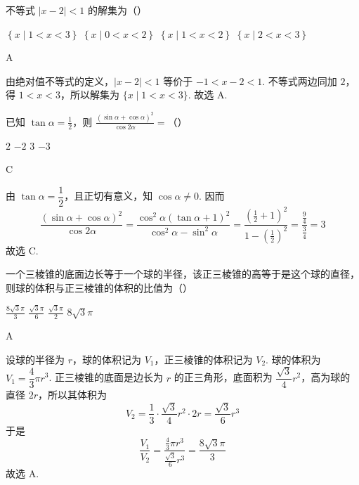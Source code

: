 \begin{problem}
不等式 \( |x-2|<1 \) 的解集为（\quad）

\choices
    {\( \left\{x \mid 1<x<3\right\} \)}
    {\( \left\{x \mid 0<x<2\right\} \)}
    {\( \left\{x \mid 1<x<2\right\} \)}
    {\( \left\{x \mid 2<x<3\right\} \)}
\end{problem}

\begin{answer}
A
\end{answer}

\begin{solution}
由绝对值不等式的定义，\(|x-2|<1\) 等价于 \(-1<x-2<1\). 不等式两边同加 \(2\)，得 \(1<x<3\)，所以解集为 \(\{x\mid 1<x<3\}\). 故选 A.
\end{solution}

\begin{problem}
已知 \( \tan\alpha=\frac{1}{2} \)，则 \( \frac{(\sin\alpha+\cos\alpha)^{2}}{\cos2\alpha}= \)（\quad）

\choices
    {\(2\)}
    {\(-2\)}
    {\(3\)}
    {\(-3\)}
\end{problem}

\begin{answer}
C
\end{answer}

\begin{solution}
由 \(\tan\alpha=\dfrac{1}{2}\)，且正切有意义，知 \(\cos\alpha\ne0\). 因而
\[
\frac{(\sin\alpha+\cos\alpha)^2}{\cos2\alpha}=\frac{\cos^2\alpha(\tan\alpha+1)^2}{\cos^2\alpha-\sin^2\alpha}=\frac{\left(\frac12+1\right)^2}{1-\left(\frac12\right)^2}=\frac{\frac{9}{4}}{\frac{3}{4}}=3
\]
故选 C.
\end{solution}

\begin{problem}
一个三棱锥的底面边长等于一个球的半径，该正三棱锥的高等于是这个球的直径，则球的体积与正三棱锥的体积的比值为（\quad）

\choices
    {\( \frac{8\sqrt{3}\pi}{3} \)}
    {\( \frac{\sqrt{3}\pi}{6} \)}
    {\( \frac{\sqrt{3}\pi}{2} \)}
    {\( 8\sqrt{3}\pi \)}
\end{problem}

\begin{answer}
A
\end{answer}

\begin{solution}
设球的半径为 \(r\)，球的体积记为 \(V_1\)，正三棱锥的体积记为 \(V_2\). 球的体积为 \(V_1=\dfrac{4}{3}\pi r^3\). 正三棱锥的底面是边长为 \(r\) 的正三角形，底面积为 \(\dfrac{\sqrt3}{4}r^2\)，高为球的直径 \(2r\)，所以其体积为
\[
V_2=\frac13\cdot\frac{\sqrt3}{4}r^2\cdot2r=\frac{\sqrt3}{6}r^3
\]
于是
\[
\frac{V_1}{V_2}=\frac{\frac43\pi r^3}{\frac{\sqrt3}{6}r^3}=\frac{8\sqrt3\pi}{3}
\]
故选 A.
\end{solution}

